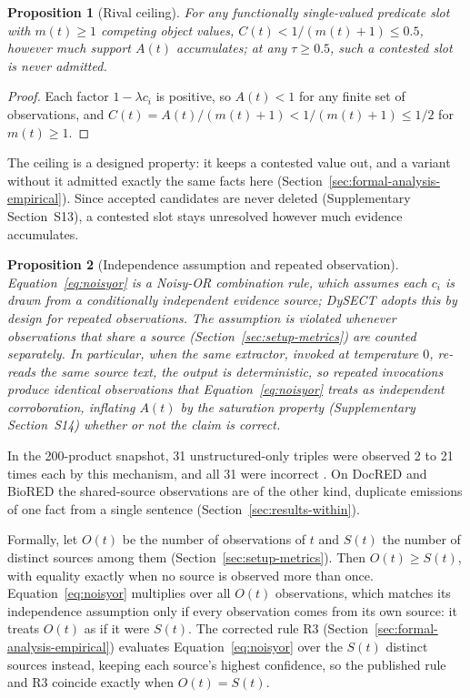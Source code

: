 \documentclass[preprint,12pt,authoryear]{elsarticle}
\newtheorem{proposition}{Proposition}
\begin{document}
\begin{proposition}[Rival ceiling]
\label{prop:ceiling}
For any functionally single-valued predicate slot with $m(t) \ge 1$
competing object values, $C(t) < 1/(m(t)+1) \le 0.5$, however much
support $A(t)$ accumulates; at any $\tau \ge 0.5$, such a contested slot
is never admitted.
\end{proposition}
\begin{proof}
Each factor $1-\lambda c_i$ is positive, so $A(t) < 1$ for any finite set
of observations, and $C(t) = A(t)/(m(t)+1) < 1/(m(t)+1) \le 1/2$ for
$m(t) \ge 1$.
\end{proof}
The ceiling is a designed property: it keeps a contested value out, and
a variant without it admitted exactly the same facts here
(Section~\ref{sec:formal-analysis-empirical}). Since accepted candidates
are never deleted (Supplementary Section~S13), a contested slot stays
unresolved however much evidence accumulates.

\begin{proposition}[Independence assumption and repeated observation]
\label{prop:independence}
Equation~\ref{eq:noisyor} is a Noisy-OR combination rule, which assumes
each $c_i$ is drawn from a conditionally independent evidence source;
DySECT adopts this by design for repeated observations. The assumption
is violated whenever observations that share a source
(Section~\ref{sec:setup-metrics}) are counted separately. In particular,
when the same extractor, invoked at temperature $0$, re-reads the same
source text, the output is deterministic, so repeated invocations
produce identical observations that Equation~\ref{eq:noisyor} treats as
independent corroboration, inflating $A(t)$ by the saturation property
(Supplementary Section~S14) whether or not the claim is correct.
\end{proposition}
In the 200-product snapshot, 31 unstructured-only triples were observed
2 to 21 times each by this mechanism, and all 31 were incorrect
. On DocRED and BioRED the shared-source observations are of the other
kind, duplicate emissions of one fact from a single sentence
(Section~\ref{sec:results-within}).

Formally, let $O(t)$ be the number of observations of $t$ and $S(t)$ the
number of distinct sources among them (Section~\ref{sec:setup-metrics}).
Then $O(t) \ge S(t)$, with equality exactly when no source is observed
more than once. Equation~\ref{eq:noisyor} multiplies over all $O(t)$
observations, which matches its independence assumption only if every
observation comes from its own source: it treats $O(t)$ as if it were
$S(t)$. The corrected rule R3 (Section~\ref{sec:formal-analysis-empirical})
evaluates Equation~\ref{eq:noisyor} over the $S(t)$ distinct sources
instead, keeping each source's highest confidence, so the published rule
and R3 coincide exactly when $O(t) = S(t)$.
\end{document}
